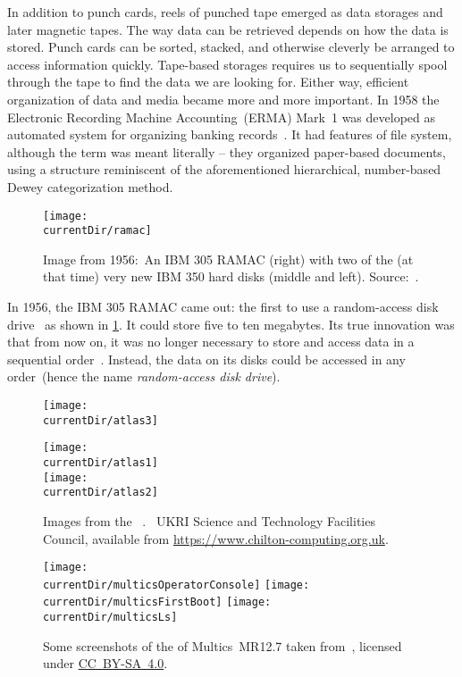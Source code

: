 In addition to punch cards, reels of punched tape emerged as data storages and later magnetic tapes.
The way data can be retrieved depends on how the data is stored.
Punch cards can be sorted, stacked, and otherwise cleverly be arranged to access information quickly.
Tape-based storages requires us to sequentially spool through the tape to find the data we are looking for.
Either way, efficient organization of data and media became more and more important.
In 1958 the Electronic Recording Machine Accounting~(ERMA) Mark~1 was developed as automated system for organizing banking records~\cite{BIF1958OARORGIALSEP}.
It had features of file system, although the term  was meant literally -- they organized paper-based documents, using a structure reminiscent of the aforementioned hierarchical, number-based Dewey categorization method.

\begin{figure}%
\centering%
\texttt{[image: \\currentDir/ramac]}%
\caption{Image from 1956:~An IBM 305 RAMAC (right) with two of the (at that time) very new IBM 350 hard disks (middle and left). %
Source:~\cite{G2016I3EKMUDDFW6}.}%
\label{fig:G2016I3EKMUDDFW6}%
\end{figure}%

In 1956, the IBM 305 RAMAC came out: the first to use a random-access disk drive~\cite{IRTFRADDRHBUCASTSFEFSFTE} as shown in \cref{fig:G2016I3EKMUDDFW6}.
It could store five to ten megabytes.
Its true innovation was that from now on, it was no longer necessary to store and access data in a sequential order~\cite{C20245YOQ}.
Instead, the data on its disks could be accessed in any order~(hence the name \emph{random-access disk drive}).

\begin{figure}%
\centering%
\floatSep%
\parbox{0.55\linewidth}{\centering%
\texttt{[image: \\currentDir/atlas3]}%
}%
\floatSep%
\parbox{0.35\linewidth}{\centering%
\texttt{[image: \\currentDir/atlas1]}\\[5pt]%
\texttt{[image: \\currentDir/atlas2]}%
}%
\floatSep%
%
\caption{Images from the ~\cite{M2025CC:FCSA1B1}. %
\textcopyright~UKRI Science and Technology Facilities Council, available from \url{https://www.chilton-computing.org.uk}.}%
\label{fig:M2025CC:FCSA1B1}%
\end{figure}%
%
\begin{figure}%
\centering%
\texttt{[image: \\currentDir/multicsOperatorConsole]}%
\floatSep%
\texttt{[image: \\currentDir/multicsFirstBoot]}%
\floatSep%
\texttt{[image: \\currentDir/multicsLs]}%
%
\caption{Some screenshots of the  of Multics~MR12.7 taken from~\cite{BWAOEOSH:M}, licensed under \href{https://creativecommons.org/licenses/by-sa/4.0}{CC~BY\nobreakdashes-SA~4.0}.}%
\label{fig:BWAOEOSH:M}%
\end{figure}%

